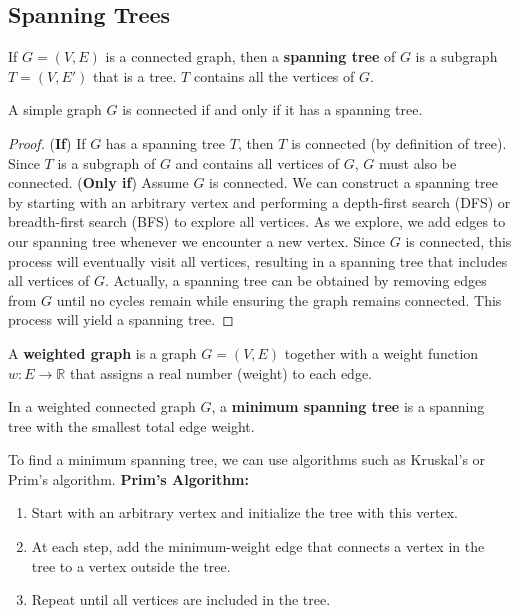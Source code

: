 \documentclass[oneside]{book}
\begin{document}
\subsection{Spanning Trees}

\begin{definition}
If $G=(V,E)$ is a connected graph, then a \textbf{spanning tree} of $G$ is a subgraph $T=(V,E')$ that is a tree. $T$ contains all the vertices of $G$.
\end{definition}

\begin{theorem}
A simple graph $G$ is connected if and only if it has a spanning tree.
\end{theorem}

\begin{proof}
(\textbf{If}) If $G$ has a spanning tree $T$, then $T$ is connected (by definition of tree). Since $T$ is a subgraph of $G$ and contains all vertices of $G$, $G$ must also be connected.
(\textbf{Only if}) Assume $G$ is connected. We can construct a spanning tree by starting with an arbitrary vertex and performing a depth-first search (DFS) or breadth-first search (BFS) to explore all vertices. As we explore, we add edges to our spanning tree whenever we encounter a new vertex. Since $G$ is connected, this process will eventually visit all vertices, resulting in a spanning tree that includes all vertices of $G$.
Actually, a spanning tree can be obtained by removing edges from $G$ until no cycles remain while ensuring the graph remains connected. This process will yield a spanning tree.
\end{proof}

\begin{definition}
A \textbf{weighted graph} is a graph $G=(V,E)$ together with a weight function $w: E \to \mathbb{R}$ that assigns a real number (weight) to each edge.
\end{definition}

\begin{definition}
In a weighted connected graph $G$, a \textbf{minimum spanning tree} is a spanning tree with the smallest total edge weight.
\end{definition}

To find a minimum spanning tree, we can use algorithms such as Kruskal's or Prim's algorithm.
\textbf{Prim's Algorithm:}
\begin{enumerate}
    \item Start with an arbitrary vertex and initialize the tree with this vertex.
    \item At each step, add the minimum-weight edge that connects a vertex in the tree to a vertex outside the tree.
    \item Repeat until all vertices are included in the tree.
\end{enumerate}
\end{document}
